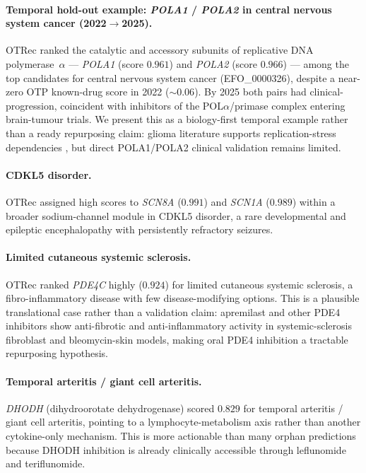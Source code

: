\documentclass{article}
\begin{document}
\paragraph{Temporal hold-out example: \textit{POLA1} / \textit{POLA2} in central nervous system cancer (2022$\to$2025).}
OTRec ranked the catalytic and accessory subunits of replicative DNA
polymerase~$\alpha$ --- \textit{POLA1} (score $0.961$) and
\textit{POLA2} (score $0.966$) --- among the top candidates for
central nervous system cancer (EFO\_0000326), despite a near-zero OTP
known-drug score in 2022 ($ {\sim}0.06$). By 2025 both pairs had clinical-progression, coincident with inhibitors of the POL$\alpha$/primase complex entering brain-tumour trials. %
We present this as a biology-first temporal example rather than a ready
repurposing claim: glioma literature supports replication-stress
dependencies \citep{morgan_replication_2018}, but direct POLA1/POLA2 clinical validation remains limited.

\paragraph{CDKL5 disorder.}
OTRec assigned high scores to \textit{SCN8A} ($0.991$) and
\textit{SCN1A} ($0.989$) within a broader sodium-channel module in
CDKL5 disorder, a rare developmental and epileptic encephalopathy with
persistently refractory seizures.

\paragraph{Limited cutaneous systemic sclerosis.}
OTRec ranked \textit{PDE4C} highly ($0.924$) for limited cutaneous
systemic sclerosis, a fibro-inflammatory disease with few
disease-modifying options.
This is a plausible translational case rather than a validation claim:
apremilast and other PDE4 inhibitors show anti-fibrotic and
anti-inflammatory activity in systemic-sclerosis fibroblast and
bleomycin-skin models, making oral PDE4 inhibition a tractable
repurposing hypothesis.  %

\paragraph{Temporal arteritis / giant cell arteritis.}
\textit{DHODH} (dihydroorotate dehydrogenase) scored $0.829$ for temporal
arteritis / giant cell arteritis, pointing to a lymphocyte-metabolism
axis rather than another cytokine-only mechanism.
This is more actionable than many orphan predictions because DHODH inhibition is already clinically accessible through leflunomide and teriflunomide. 
\end{document}
